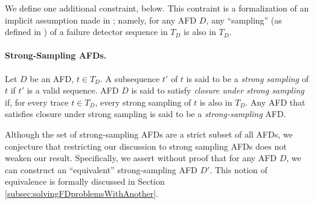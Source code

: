 \documentclass[11pt]{article}
\numberwithin{theorem}{section}
\newcommand{\FD}{D}
\begin{document}
\begin{comment}
Fix $e$ and $e'$ to be a pair of events in $t$ such that $e$ precedes $e'$ in $t$; that is,  $e = t[x]$ and $e' = t[y]$ such that $x < y$. Consider the following two cases: (a) $loc(e) = loc(e')$  and $e,e' \in O_D$, and (b) 
$e \in \hat{I}$ and $e' \in O_D$. 

\emph{Case (a).} Let $loc(e) = loc(e')$ and $e,e' \in O_D$. Since $t|_{O_D} = t'|_{O_D}$, $e$ precedes $e'$ in $t'$.

\emph{Case (b).} Let $e \in \hat{I}$ and $e' \in O_D$. Note that $e = t[x] = t'[f(x)]$, and $e' = t[y] = t'[f(y)]$. By construction, we know that $f(x) \leq x$, and from the claim above, we know that $y \leq f(y)$. Since $x<y$, we conclude that $f(x) < f(y)$; that is,  $e$ precedes $e'$ in $t'$.

From cases (a) and (b), we conclude that if (1) $e$ precedes $e'$ in $t$, and
(2) either (a) $loc(e) = loc(e')$ and $e,e' \in O_D$, or (b) $e \in \hat{I}$ and $e \in O_D$, then $e$ precedes
$e'$ in $t'$ as well. By hypotheses, $t'$ is a valid sequence.
Therefore, $t'$ is a constrained reordering of $t$. Since $t$ is in $T_D$, by closure under constrained reordering, we know that $t'$ is in $T_D$.
\end{proof}
\end{comment}

We define one additional constraint, below.
This contraint is a formalization of an implicit assumption made in 
\cite{chan:twfdf}; namely, for any AFD $D$, any ``sampling'' (as
defined in \cite{char:isolt}) of a failure detector sequence in $T_D$
is also in $T_D$. 


\paragraph{Strong-Sampling AFDs.}
Let $\FD$ be an AFD, $t \in T_{\FD}$. 
A subsequence $t'$ of $t$ is said to be a \emph{strong sampling} of
$t$ if $t'$ is a valid sequence.
AFD $\FD$ is said to satisfy \emph{closure under strong sampling} if,
for every trace $t \in T_{\FD}$, every strong sampling of $t$ is also in
$T_{\FD}$. Any AFD that satisfies closure under strong sampling is said to
be a \emph{strong-sampling} AFD.

Although the set of strong-sampling AFDs are a strict subset of all AFDs, we conjecture that restricting our discussion to strong sampling AFDs does not weaken our result. Specifically, we assert without proof that for any AFD $D$, we can construct an ``equivalent'' strong-sampling AFD $D'$. This notion of equivalence is formally discussed in  Section \ref{subsec:solvingFDproblemsWithAnother}.
\end{document}
